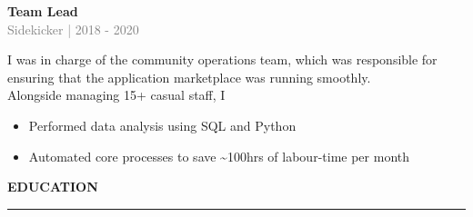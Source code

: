 \documentclass[10pt]{article}
\begin{document}
\vspace{0.5cm}
{\bf Team Lead} \\
\textcolor{gray}{Sidekicker | 2018 - 2020} \\[3pt]
\begin{small}
I was in charge of the community operations team,  which was responsible for ensuring that the application marketplace was running smoothly.\\

Alongside managing 15+ casual staff, I

\begin{itemize}
\item Performed data analysis using SQL and Python

\item Automated core processes to save \textasciitilde{}100hrs of labour-time per month

\end{itemize}

\end{small}

\vspace{1cm}
\begin{large}
{\bf EDUCATION} \\
\textcolor{gray}{\rule{2cm}{2mm}}
\end{large}
\vspace{5pt}
\end{document}
